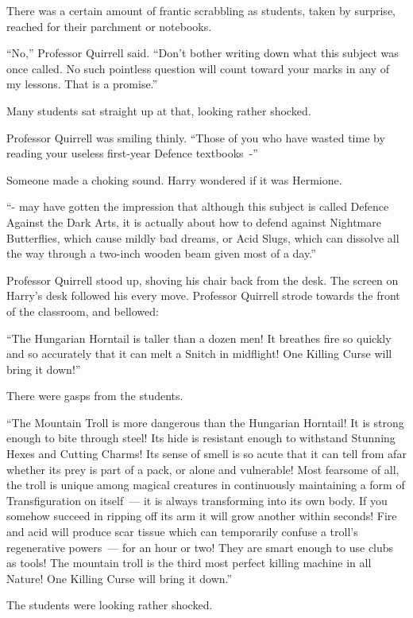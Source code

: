 There was a certain amount of frantic scrabbling as students, taken by surprise, reached for their parchment or notebooks.

``No,'' Professor Quirrell said. ``Don't bother writing down what this subject was once called. No such pointless question will count toward your marks in any of my lessons. That is a promise.''

Many students sat straight up at that, looking rather shocked.

Professor Quirrell was smiling thinly. ``Those of you who have wasted time by reading your useless first-year Defence textbooks~-''

Someone made a choking sound. Harry wondered if it was Hermione.

``- may have gotten the impression that although this subject is called Defence Against the Dark Arts, it is actually about how to defend against Nightmare Butterflies, which cause mildly bad dreams, or Acid Slugs, which can dissolve all the way through a two-inch wooden beam given most of a day.''

Professor Quirrell stood up, shoving his chair back from the desk. The screen on Harry's desk followed his every move. Professor Quirrell strode towards the front of the classroom, and bellowed:

``The Hungarian Horntail is taller than a dozen men! It breathes fire so quickly and so accurately that it can melt a Snitch in midflight! One Killing Curse will bring it down!''

There were gasps from the students.

``The Mountain Troll is more dangerous than the Hungarian Horntail! It is strong enough to bite through steel! Its hide is resistant enough to withstand Stunning Hexes and Cutting Charms! Its sense of smell is so acute that it can tell from afar whether its prey is part of a pack, or alone and vulnerable! Most fearsome of all, the troll is unique among magical creatures in continuously maintaining a form of Transfiguration on itself~--- it is always transforming into its own body. If you somehow succeed in ripping off its arm it will grow another within seconds! Fire and acid will produce scar tissue which can temporarily confuse a troll's regenerative powers~--- for an hour or two! They are smart enough to use clubs as tools! The mountain troll is the third most perfect killing machine in all Nature! One Killing Curse will bring it down.''

The students were looking rather shocked.

